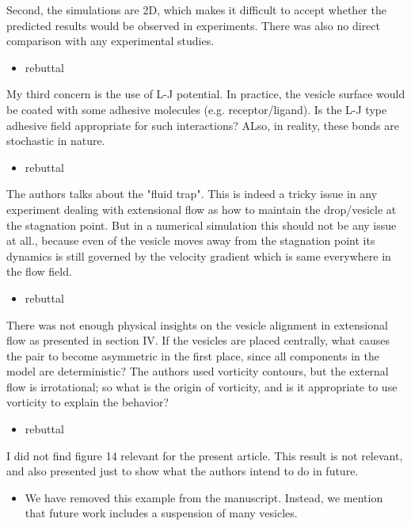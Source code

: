 \documentclass[11pt]{article}
\newcommand{\comment}[1]{{\color{blue} #1}}
\begin{document}
\noindent
\comment{Second, the simulations are 2D, which makes it difficult to accept
whether the predicted results would be observed in experiments. There
was also no direct comparison with any experimental studies.}
\begin{itemize}
  \item rebuttal
\end{itemize}

\noindent
\comment{My third concern is the use of L-J potential. In practice, the
vesicle surface would be coated with some adhesive molecules (e.g.
receptor/ligand). Is the L-J type adhesive field appropriate for such
interactions? ALso, in reality, these bonds are stochastic in nature.}
\begin{itemize}
  \item rebuttal
\end{itemize}

\noindent
\comment{The authors talks about the "fluid trap". This is indeed a tricky
issue in any experiment dealing with extensional flow as how to
maintain the drop/vesicle at the stagnation point. But in a numerical
simulation this should not be any issue at all., because even of the
vesicle moves away from the stagnation point its dynamics is still
governed by the velocity gradient which is same everywhere in the flow
field.}
\begin{itemize}
  \item rebuttal
\end{itemize}

\noindent
\comment{There was not enough physical insights on the vesicle alignment
in extensional flow as presented in section IV. If the vesicles are
placed centrally, what causes the pair to become asymmetric in the first
place, since all components in the model are deterministic? The authors
used vorticity contours, but the external flow is irrotational; so what
is the origin of vorticity, and is it appropriate to use vorticity to
explain the behavior?}
\begin{itemize}
  \item rebuttal
\end{itemize}

\noindent
\comment{I did not find figure 14 relevant for the present article. This
result is not relevant, and also presented just to show what the authors
intend to do in future.}
\begin{itemize}
  \item We have removed this example from the manuscript.  Instead, we
    mention that future work includes a suspension of many vesicles.
\end{itemize}
\end{document}

